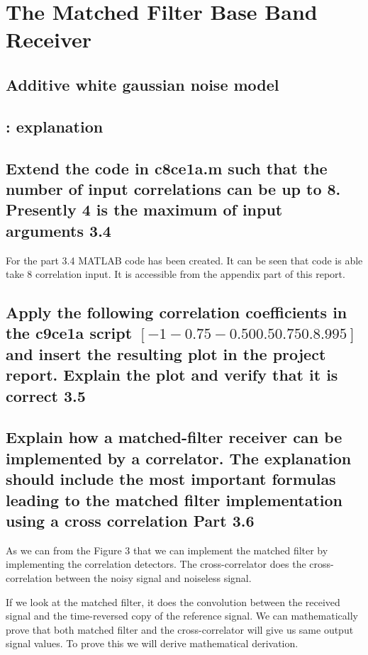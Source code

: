 \section{The Matched Filter Base Band Receiver}



\subsection{Additive white gaussian noise model}



\subsection{: explanation}
\subsection{Extend the code in c8ce1a.m such that the number of input correlations can be up to 8. Presently 4 is the maximum of input arguments 3.4}
For the part 3.4  MATLAB code has been created. It can be seen that code is able take 8 correlation input. It is accessible from the appendix part of this report.
\subsection{Apply the following correlation coefficients in the c9ce1a script  $[-1 -0.75 -0.5 0 0.5 0.75 0. 8 .995]$ and insert the resulting plot in the project report. Explain the plot and verify that it is correct 3.5}
\subsection{ Explain how a matched-filter receiver can be implemented by a correlator. The explanation should include the most important formulas leading to the matched filter implementation using a cross correlation Part 3.6}
As we can from the Figure 3 that we can implement the matched filter by implementing the correlation detectors. The cross-correlator does the cross-correlation between the noisy signal and noiseless signal. 

If we look at the matched filter, it does the convolution between the received signal and the time-reversed copy of the reference signal. We can mathematically prove that both matched filter and the cross-correlator will give us same output signal values. To prove this we will derive mathematical  derivation. 

